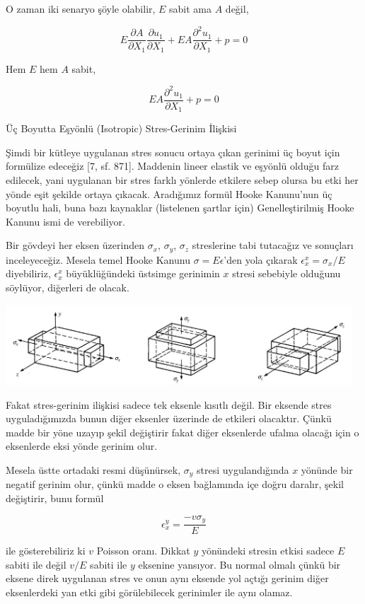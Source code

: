 \documentclass[12pt,fleqn]{article}\usepackage{../../common}
\begin{document}
O zaman iki senaryo şöyle olabilir, $E$ sabit ama $A$ değil,

$$
E \frac{\partial A}{\partial X_1} \frac{\partial u_1}{\partial X_1} +
EA \frac{\partial^2 u_1}{\partial X_1} + p = 0
$$

Hem $E$ hem $A$ sabit,

$$
E A \frac{\partial^2 u_1}{\partial X_1} + p = 0
$$

Üç Boyutta Eşyönlü (Isotropic) Stres-Gerinim İlişkisi 

Şimdi bir kütleye uygulanan stres sonucu ortaya çıkan gerinimi üç boyut için
formülize edeceğiz [7, sf. 871]. Maddenin lineer elastik ve eşyönlü olduğu farz
edilecek, yani uygulanan bir stres farklı yönlerde etkilere sebep olursa bu etki
her yönde eşit şekilde ortaya çıkacak. Aradığımız formül Hooke Kanunu'nun üç
boyutlu hali, buna bazı kaynaklar (listelenen şartlar için) Genelleştirilmiş
Hooke Kanunu ismi de verebiliyor.

Bir gövdeyi her eksen üzerinden $\sigma_x$, $\sigma_y$, $\sigma_z$ streslerine
tabi tutacağız ve sonuçları inceleyeceğiz. Mesela temel Hooke Kanunu $\sigma = E
\epsilon$'den yola çıkarak $\epsilon_x^x = \sigma_x / E$ diyebiliriz,
$\epsilon_x^x$ büyüklüğündeki üstsimge gerinimin $x$ stresi sebebiyle olduğunu
söylüyor, diğerleri de olacak.

\includegraphics[width=35em]{phy_020_strs_00_10.jpg}

Fakat stres-gerinim ilişkisi sadece tek eksenle kısıtlı değil. Bir eksende stres
uyguladığımızda bunun diğer eksenler üzerinde de etkileri olacaktır.  Çünkü
madde bir yöne uzayıp şekil değiştirir fakat diğer eksenlerde ufalma olacağı
için o eksenlerde eksi yönde gerinim olur.

Mesela üstte ortadaki resmi düşünürsek, $\sigma_y$ stresi uygulandığında $x$
yönünde bir negatif gerinim olur, çünkü madde o eksen bağlamında içe doğru
daralır, şekil değiştirir, bunu formül

$$
\epsilon_x^y =  \frac{- v \sigma_y}{E}
$$

ile gösterebiliriz ki $v$ Poisson oranı. Dikkat $y$ yönündeki stresin etkisi
sadece $E$ sabiti ile değil $v/E$ sabiti ile $y$ eksenine yansıyor. Bu normal
olmalı çünkü bir eksene direk uygulanan stres ve onun aynı eksende yol açtığı
gerinim diğer eksenlerdeki yan etki gibi görülebilecek gerinimler ile aynı
olamaz.
\end{document}
